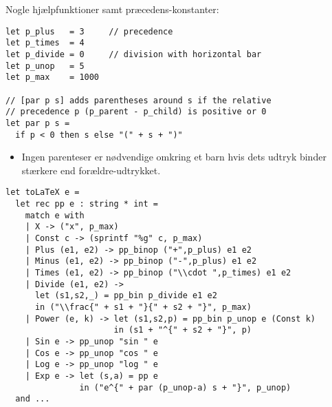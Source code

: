 \documentclass[rgb]{beamer}
\begin{document}
\begin{frame}[fragile]
\begin{footnotesize}


  \vspace{1ex}

  Nogle hjælpfunktioner samt præcedens-konstanter:
  \vspace{1ex}

\begin{lstlisting}[numbers=none,frame=none,mathescape]
let p_plus   = 3     // precedence
let p_times  = 4
let p_divide = 0     // division with horizontal bar
let p_unop   = 5
let p_max    = 1000

// [par p s] adds parentheses around s if the relative
// precedence p (p_parent - p_child) is positive or 0
let par p s =
  if p < 0 then s else "(" + s + ")"
\end{lstlisting}

\vspace{1ex}
\begin{itemize}
  \item Ingen parenteser er nødvendige omkring et barn hvis dets udtryk
    binder stærkere end forældre-udtrykket.
\end{itemize}

\end{footnotesize}
\end{frame}

\begin{frame}[fragile]
\begin{footnotesize}


\begin{lstlisting}[numbers=none,frame=none,mathescape]
let toLaTeX e =
  let rec pp e : string * int =
    match e with
    | X -> ("x", p_max)
    | Const c -> (sprintf "%g" c, p_max)
    | Plus (e1, e2) -> pp_binop ("+",p_plus) e1 e2
    | Minus (e1, e2) -> pp_binop ("-",p_plus) e1 e2
    | Times (e1, e2) -> pp_binop ("\\cdot ",p_times) e1 e2
    | Divide (e1, e2) ->
      let (s1,s2,_) = pp_bin p_divide e1 e2
      in ("\\frac{" + s1 + "}{" + s2 + "}", p_max)
    | Power (e, k) -> let (s1,s2,p) = pp_bin p_unop e (Const k)
                      in (s1 + "^{" + s2 + "}", p)
    | Sin e -> pp_unop "sin " e
    | Cos e -> pp_unop "cos " e
    | Log e -> pp_unop "log " e
    | Exp e -> let (s,a) = pp e
               in ("e^{" + par (p_unop-a) s + "}", p_unop)
  and ...
\end{lstlisting}

\end{footnotesize}
\end{frame}
\end{document}
